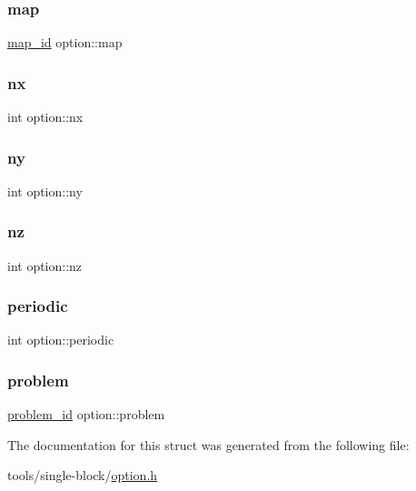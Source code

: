 \subsubsection{\texorpdfstring{map}{map}}
{\footnotesize\ttfamily \mbox{\hyperlink{map_8h_accd0c06936991a4f805c3d1e0d116368}{map\+\_\+id}} option\+::map}

\mbox{\label{structoption_a412dcc8397a83f8c750c418384f5039f}} 
\subsubsection{\texorpdfstring{nx}{nx}}
{\footnotesize\ttfamily int option\+::nx}

\mbox{\label{structoption_aebfa4d915ceec63c92a0df6f85f9372e}} 
\subsubsection{\texorpdfstring{ny}{ny}}
{\footnotesize\ttfamily int option\+::ny}

\mbox{\label{structoption_ab205e35229ba8ed0ce0fa7f469120921}} 
\subsubsection{\texorpdfstring{nz}{nz}}
{\footnotesize\ttfamily int option\+::nz}

\mbox{\label{structoption_aa045fec086086bd8bc4f6d333c549209}} 
\subsubsection{\texorpdfstring{periodic}{periodic}}
{\footnotesize\ttfamily int option\+::periodic}

\mbox{\label{structoption_aa43577f2139053a973dfabaa1ea623b8}} 
\subsubsection{\texorpdfstring{problem}{problem}}
{\footnotesize\ttfamily \mbox{\hyperlink{problem_8h_acef34e4550d8d3c9873193b0aad44fa0}{problem\+\_\+id}} option\+::problem}



The documentation for this struct was generated from the following file\+:\begin{DoxyCompactItemize}
\item 
tools/single-\/block/\mbox{\hyperlink{option_8h}{option.\+h}}\end{DoxyCompactItemize}
